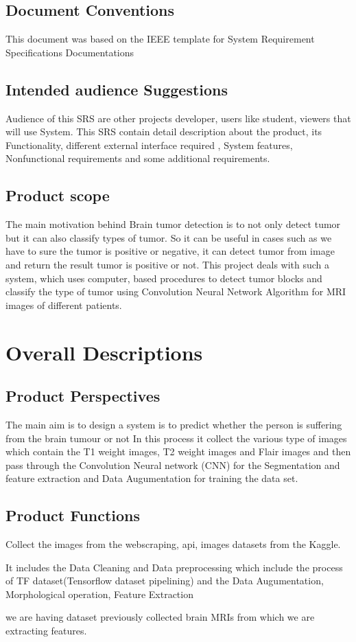 \documentclass{article}
\begin{document}
\subsection{Document Conventions}
This document was based on the IEEE template for System Requirement Specifications Documentations
\subsection{Intended audience Suggestions  }
\item Audience of this SRS are other projects developer, users like student, viewers that will use System.
This SRS contain detail description about the product, its Functionality, different external interface
required , System features, Nonfunctional requirements and some additional requirements. 

\subsection{Product scope}
The main motivation behind Brain tumor detection is to not only detect tumor but it can also classify types
of tumor. So it can be useful in cases such as we have to sure the tumor is positive or negative, it can detect
tumor from image and return the result tumor is positive or not. This project deals with such a system,
which uses computer, based procedures to detect tumor blocks and classify the type of tumor using
Convolution Neural Network Algorithm for MRI images of different patients. 
\newpage
\section{\textbf{Overall Descriptions}}

\subsection{ Product Perspectives}
The main aim is to design a system is to predict whether the person is suffering from the brain tumour or not In
this process it collect the various type of images which contain the T1 weight images, T2 weight images and Flair
images and then pass through the Convolution Neural network (CNN) for the Segmentation and feature extraction
and Data Augumentation for training the data set. 

\subsection{ Product Functions }
\item Collect the images from the webscraping, api, images datasets from the Kaggle.
\item It includes the Data Cleaning and Data preprocessing which include the process of TF dataset(Tensorflow
dataset pipelining) and the Data Augumentation, Morphological operation, Feature Extraction
\item we are having dataset previously collected brain MRIs from which we are extracting features. 
\end{document}
